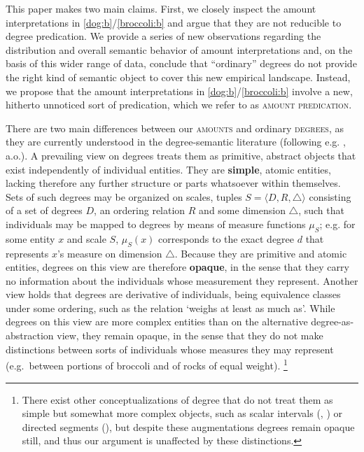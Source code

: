\documentclass[a4paper,12pt,twoside]{article}
\begin{document}
	This paper makes two main claims. First, we closely inspect the amount interpretations in \ref{dog:b}/\ref{broccoli:b} and argue that they are not reducible to degree predication. We provide a series of new observations regarding the distribution and overall semantic behavior of amount interpretations and, on the basis of this wider range of data, conclude that ``ordinary'' degrees do not provide the right kind of semantic object to cover this new empirical landscape. Instead, we propose that the amount interpretations in \ref{dog:b}/\ref{broccoli:b} involve a new, hitherto unnoticed sort of predication, which we refer to as \textsc{amount predication}.
	
	There are two main differences between our \textsc{amounts} and ordinary \textsc{degrees}, as they are currently understood in the degree-semantic literature (following e.g. \citealt{vonStechow:1984, Heim:1985, Kennedy:1999}, a.o.). A prevailing view on degrees treats them as primitive, abstract objects that exist independently of individual entities. They are \textbf{simple}, atomic entities, lacking therefore any further structure or parts whatsoever within themselves. Sets of such degrees may be organized on scales, tuples $S = \langle D, R, \triangle \rangle$ consisting of a set of degrees $D$, an ordering relation $R$ and some dimension $\triangle$, such that individuals may be mapped to degrees by means of measure functions $\mu_S$; e.g. for some entity $x$ and scale $S$, $\mu_S(x)$ corresponds to the exact degree $d$ that represents $x$'s measure on   dimension  $\triangle$. Because they are primitive and atomic entities, degrees on this view are therefore \textbf{opaque}, in the sense that they carry no information about the individuals whose measurement they represent. Another view \citep{Cresswell:1977, Klein:1980, Klein:1991, Bale:2008} holds that degrees are derivative of individuals, being equivalence classes under some ordering, such as the relation `weighs at least as much as'. While degrees on this view are more complex entities than on the alternative degree-as-abstraction view, they remain opaque, in the sense that they do not make distinctions between sorts of individuals whose measures they  may represent (e.g.\ between portions of broccoli and of rocks of equal weight).%
	\footnote{
		There exist  other conceptualizations of degree that do not treat them as simple but somewhat more complex objects, such as scalar intervals (\citealt{Kennedy:2001}, \citealt{Schwarzschild&Wilkinson:2002}) or directed segments (\citealt{Schwarzschild:2012, Schwarzschild:2020}), but despite these augmentations degrees remain opaque still, and thus our argument is unaffected by these distinctions. 
	} %
	
\end{document}
